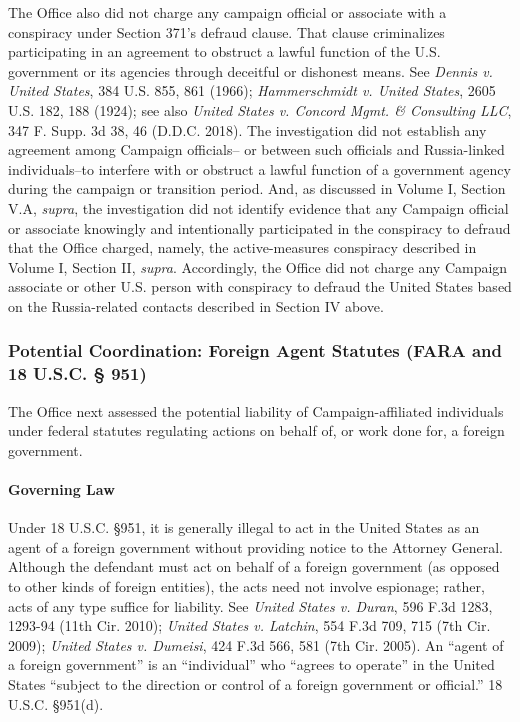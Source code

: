 The Office also did not charge any campaign official or associate with a conspiracy under Section 371's defraud clause.
That clause criminalizes participating in an agreement to obstruct a lawful function of the U.S. government or its agencies through deceitful or dishonest means.
See \textit{Dennis v. United States}, 384 U.S. 855, 861 (1966); \textit{Hammerschmidt v. United States}, 2605 U.S. 182, 188 (1924); see also \textit{United States v. Concord Mgmt. \& Consulting LLC}, 347 F. Supp. 3d 38, 46 (D.D.C. 2018).
The investigation did not establish any agreement among Campaign officials-- or between such officials and Russia-linked individuals--to interfere with or obstruct a lawful function of a government agency during the campaign or transition period.
And, as discussed in Volume I, Section V.A, \textit{supra}, the investigation did not identify evidence that any Campaign official or associate knowingly and intentionally participated in the conspiracy to defraud that the Office charged, namely, the active-measures conspiracy described in Volume I, Section II, \textit{supra}.
Accordingly, the Office did not charge any Campaign associate or other U.S. person with conspiracy to defraud the United States based on the Russia-related contacts described in Section IV above.

\subsubsection{Potential Coordination: Foreign Agent Statutes (FARA and 18 U.S.C. § 951)}
The Office next assessed the potential liability of Campaign-affiliated individuals under federal statutes regulating actions on behalf of, or work done for, a foreign government.

\paragraph{Governing Law}
Under 18 U.S.C. \S 951, it is generally illegal to act in the United States as an agent of a foreign government without providing notice to the Attorney General.
Although the defendant must act on behalf of a foreign government (as opposed to other kinds of foreign entities), the acts need not involve espionage; rather, acts of any type suffice for liability.
See \textit{United States v. Duran}, 596 F.3d 1283, 1293-94 (11th Cir. 2010); \textit{United States v. Latchin}, 554 F.3d 709, 715 (7th Cir. 2009); \textit{United States v. Dumeisi}, 424 F.3d 566, 581 (7th Cir. 2005).
An ``agent of a foreign government'' is an ``individual'' who ``agrees to operate'' in the United States ``subject to the direction or control of a foreign government or official.'' 18 U.S.C. \S 951(d).


